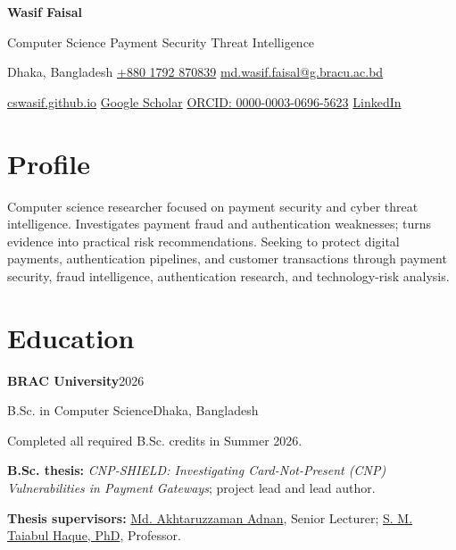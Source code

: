 \documentclass[10pt,a4paper]{article}
\newcommand{\entry}[4]{\textbf{#1}\hfill #2\par {\color{muted}#3}\hfill {\color{muted}#4}\par}
\begin{document}
{\fontsize{22}{24}\selectfont\bfseries\color{accent} Wasif Faisal}\par
\vspace{2pt}
{\large Computer Science \enspace\textbar\enspace Payment Security \enspace\textbar\enspace Threat Intelligence}\par
\vspace{4pt}
Dhaka, Bangladesh \enspace\textbar\enspace
\href{tel:+8801792870839}{+880 1792 870839}
\enspace\textbar\enspace
\href{mailto:md.wasif.faisal@g.bracu.ac.bd}{md.wasif.faisal@g.bracu.ac.bd}\par
\href{https://cswasif.github.io/}{cswasif.github.io}
\enspace\textbar\enspace
\href{https://scholar.google.com/citations?user=K42crVoAAAAJ&hl=en}{Google Scholar}
\enspace\textbar\enspace
\href{https://orcid.org/0000-0003-0696-5623}{ORCID: 0000-0003-0696-5623}
\enspace\textbar\enspace
\href{https://www.linkedin.com/in/cswasif}{LinkedIn}\par

\section*{Profile}
Computer science researcher focused on payment security and cyber threat intelligence.
Investigates payment fraud and authentication weaknesses; turns evidence into practical risk recommendations.
Seeking to protect digital payments, authentication pipelines, and customer transactions through payment security, fraud intelligence, authentication research, and technology-risk analysis.

\section*{Education}
\entry{BRAC University}{2026}{B.Sc. in Computer Science}{Dhaka, Bangladesh}
Completed all required B.Sc. credits in Summer 2026.\par
\textbf{B.Sc. thesis:} \emph{CNP-SHIELD: Investigating Card-Not-Present (CNP) Vulnerabilities in Payment Gateways}; project lead and lead author.\par
\textbf{Thesis supervisors:} \href{https://cse.bracu.ac.bd/faculty_profile/408/md_akhtaruzaman_adnan}{Md. Akhtaruzzaman Adnan}, Senior Lecturer; \href{https://www.bracu.ac.bd/about/people/s-m-taiabul-haque-phd}{S. M. Taiabul Haque, PhD}, Professor.\par
\end{document}
